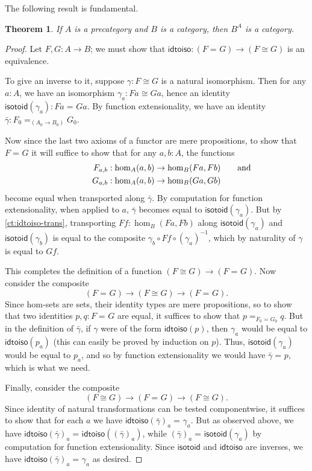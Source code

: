 \documentclass[10pt,a4paper]{article}
\providecommand{\index}[1]{}
\newcommand{\id}[3][]{\ensuremath{#2 =_{#1} #3}\xspace}
\newcommand{\inv}[1]{{#1}^{-1}}
\newcommand{\idtoiso}{\ensuremath{\mathsf{idtoiso}}\xspace}
\newcommand{\isotoid}{\ensuremath{\mathsf{isotoid}}\xspace}
\newtheorem{thm}{Theorem}[section]
\theoremstyle{definition}
\theoremstyle{remark}
\numberwithin{equation}{section}
\newcommand{\indexdef}[1]{\index{#1|defstyle}}   %
\begin{document}
The following result is fundamental.

\begin{thm}\label{ct:functor-cat}
  \indexdef{category!of functors}%
  \indexdef{functor!category of}%
  If $A$ is a precategory and $B$ is a category, then $B^A$ is a category.
\end{thm}
\begin{proof}
  Let $F,G:A\to B$; we must show that $\idtoiso:(\id{F}{G}) \to (F\cong G)$ is an equivalence.

  To give an inverse to it, suppose $\gamma:F\cong G$ is a natural isomorphism.
  Then for any $a:A$, we have an isomorphism $\gamma_a:Fa \cong Ga$, hence an identity $\isotoid(\gamma_a):\id{Fa}{Ga}$.
  By function extensionality, we have an identity $\bar{\gamma}:\id[(A_0\to B_0)]{F_0}{G_0}$.

  Now since the last two axioms of a functor are mere propositions, to show that $\id{F}{G}$ it will suffice to show that for any $a,b:A$, the functions
  \begin{align*}
    F_{a,b}&:\hom_A(a,b) \to \hom_B(Fa,Fb)\mathrlap{\qquad\text{and}}\\
    G_{a,b}&:\hom_A(a,b) \to \hom_B(Ga,Gb)
  \end{align*}
  become equal when transported along $\bar\gamma$.
  By computation for function extensionality, when applied to $a$, $\bar\gamma$ becomes equal to $\isotoid(\gamma_a)$.
  But by \cref{ct:idtoiso-trans}, transporting $Ff:\hom_B(Fa,Fb)$ along $\isotoid(\gamma_a)$ and $\isotoid(\gamma_b)$ is equal to the composite $\gamma_b\circ Ff\circ \inv{(\gamma_a)}$, which by naturality of $\gamma$ is equal to $Gf$.

  This completes the definition of a function $(F\cong G) \to (\id F G)$.
  Now consider the composite
  \[ (\id F G) \to (F\cong G) \to (\id F G). \]
  Since hom-sets are sets, their identity types are mere propositions, so to show that two identities $p,q:\id F G$ are equal, it suffices to show that $\id[\id{F_0}{G_0}]{p}{q}$.
  But in the definition of $\bar\gamma$, if $\gamma$ were of the form $\idtoiso(p)$, then $\gamma_a$ would be equal to $\idtoiso(p_a)$ (this can easily be proved by induction on $p$).
  Thus, $\isotoid(\gamma_a)$ would be equal to $p_a$, and so by function extensionality we would have $\id{\bar\gamma}{p}$, which is what we need.

  Finally, consider the composite
  \[(F\cong G)\to  (\id F G) \to (F\cong G). \]
  Since identity of natural transformations can be tested componentwise, it suffices to show that for each $a$ we have $\id{\idtoiso(\bar\gamma)_a}{\gamma_a}$.
  But as observed above, we have $\id{\idtoiso(\bar\gamma)_a}{\idtoiso((\bar\gamma)_a)}$, while $\id{(\bar\gamma)_a}{\isotoid(\gamma_a)}$ by computation for function extensionality.
  Since $\isotoid$ and $\idtoiso$ are inverses, we have $\id{\idtoiso(\bar\gamma)_a}{\gamma_a}$ as desired.
\end{proof}
\end{document}
